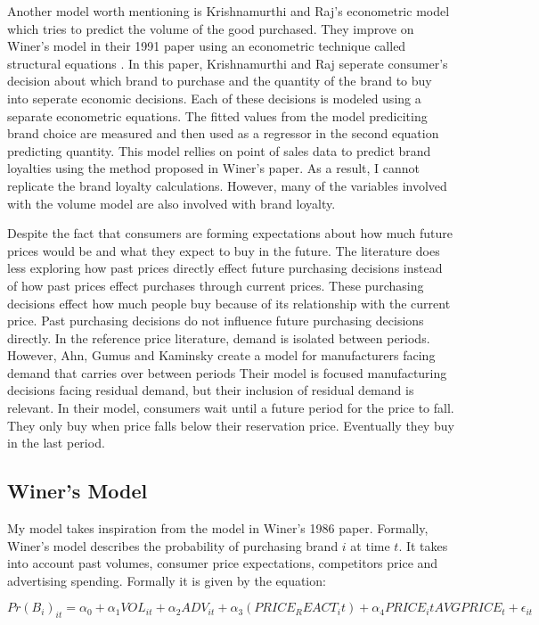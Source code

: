 \documentclass{article}
\begin{document}
Another model worth mentioning is Krishnamurthi and Raj's econometric model which tries to predict the volume of the good purchased. They improve on Winer's model in their 1991 paper using an econometric technique called structural equations \cite{krishnamurthi}.  In this paper, Krishnamurthi and Raj seperate consumer's decision about which brand to purchase and the quantity of the brand to buy into seperate economic decisions. Each of these decisions is modeled using a separate econometric equations. The fitted values from the model prediciting brand choice are measured and then used as a regressor in the second equation predicting quantity. This model rellies on point of sales data to predict brand loyalties using the method proposed in Winer's paper. As a result, I cannot replicate the brand loyalty calculations. However, many of the variables involved with the volume model are also involved with brand loyalty.


Despite the fact that consumers are forming expectations about how much future prices would be and what they expect to buy in the future.  The literature does less exploring how past prices directly effect future purchasing decisions instead of how past prices effect purchases through current prices. These purchasing decisions effect how much people buy because of its relationship with the current price. Past purchasing decisions do not influence future purchasing decisions directly.  In the reference price literature, demand is isolated between periods. However, Ahn, Gumus and Kaminsky create a model for manufacturers facing demand that carries over between periods \cite{ahn} Their model is focused manufacturing decisions facing residual demand, but their inclusion of residual demand is relevant. In their model, consumers wait until a future period for the price to fall. They only buy when price falls below their reservation price. Eventually they buy in the last period.

\subsection{Winer's Model}
My model takes inspiration from the model in Winer's 1986 paper. Formally, Winer's model describes the probability of purchasing brand $i$ at time $t$. It takes into account past volumes,  consumer price expectations, competitors price and advertising spending. Formally it is given by the equation: 

$$ {Pr(B_i)}_{it} = \alpha_0 + \alpha_1 {VOL}_{it} + \alpha_2 {ADV}_{it} +  \alpha_3 (PRICE_REACT_it)+ \alpha_4 {PRICE_it}{AVGPRICE_{t}} + \epsilon_{it}$$
\end{document}
